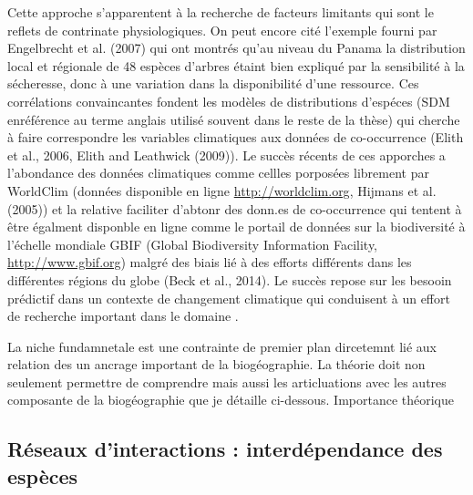 Cette approche s'apparentent à la recherche de facteurs limitants qui
sont le reflets de contrinate physiologiques. On peut encore cité
l'exemple fourni par Engelbrecht et al. (2007) qui ont montrés qu'au
niveau du Panama la distribution local et régionale de 48 espèces
d'arbres étaint bien expliqué par la sensibilité à la sécheresse, donc à
une variation dans la disponibilité d'une ressource. Ces corrélations
convaincantes fondent les modèles de distributions d'espéces (SDM
enréférence au terme anglais utilisé souvent dans le reste de la thèse)
qui cherche à faire correspondre les variables climatiques aux données
de co-occurrence (Elith et al., 2006, Elith and Leathwick (2009)). Le
succès récents de ces apporches a l'abondance des données climatiques
comme cellles porposées librement par WorldClim (données disponible en
ligne \url{http://worldclim.org}, Hijmans et al. (2005)) et la relative
faciliter d'abtonr des donn.es de co-occurrence qui tentent à être
égalment disponble en ligne comme le portail de données sur la
biodiversité à l'échelle mondiale GBIF (Global Biodiversity Information
Facility, \url{http://www.gbif.org}) malgré des biais lié à des efforts
différents dans les différentes régions du globe (Beck et al., 2014). Le
succès repose sur les besooin prédictif dans un contexte de changement
climatique qui conduisent à un effort de recherche important dans le
domaine \cite{Thomas2004,Thuiller2011}.

La niche fundamnetale est une contrainte de premier plan dircetemnt lié
aux relation des un ancrage important de la biogéographie. La théorie
doit non seulement permettre de comprendre mais aussi les articluations
avec les autres composante de la biogéographie que je détaille
ci-dessous. Importance théorique

\subsection*{Réseaux d'interactions : interdépendance des
espèces}\label{ruxe9seaux-dinteractions-interduxe9pendance-des-espuxe8ces}

